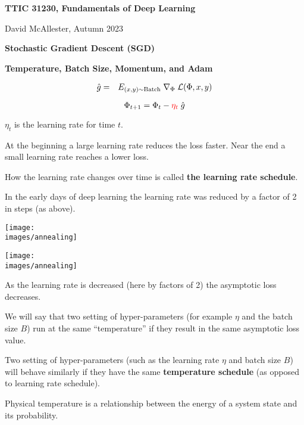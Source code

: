 


\newcommand{\solution}[1]{\bigskip {\bf Solution}: #1}



{\Huge
  \centerline{\bf TTIC 31230, Fundamentals of Deep Learning}
  \bigskip
  \centerline{David McAllester, Autumn 2023}
  \vfill
  \centerline{\bf Stochastic Gradient Descent (SGD)}
  \vfill
  \vfill
  \centerline{\bf Temperature, Batch Size, Momentum, and Adam}


\vfill
\begin{eqnarray*}
  \hat{g} & = & E_{(x,y) \sim \mathrm{Batch}}\;\nabla_\Phi\;{\cal L}(\Phi,x,y)
\end{eqnarray*}

$$\Phi_{t+1} = \Phi_t - {\color{red} \eta_t}\; \hat{g}$$


\vfill
\centerline{$\eta_t$ is the learning rate for time $t$.}



At the beginning a large learning rate reduces the loss faster. Near the end a small learning rate reaches a lower loss.

\vfill
How the learning rate changes over time is called {\bf the learning rate schedule}.

\vfill
In the early days of deep learning the learning rate was reduced by a factor of 2 in steps (as above).

\vfill
\centerline{\texttt{[image: \\images/annealing]}}


\centerline{\texttt{[image: \\images/annealing]}}

{\huge
\vfill
As the learning rate is decreased (here by factors of 2) the asymptotic loss decreases.

\vfill
We will say that two setting of hyper-parameters (for example $\eta$ and the batch size $B$) run at the same ``temperature'' if
they result in the same asymptotic loss value.

\vfill
Two setting of hyper-parameters (such as the learning rate $\eta$ and batch size $B$) will behave similarly if they have the same {\bf temperature schedule}
(as opposed to learning rate schedule).
}


{\huge
Physical temperature is a relationship between the energy of a system state and its probability.

}}
